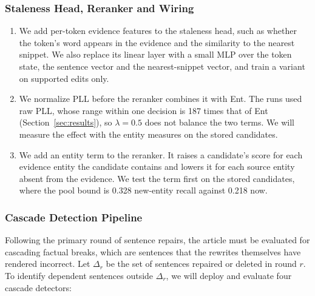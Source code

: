 \documentclass[11pt]{article}
\begin{document}
    \subsubsection{Staleness Head, Reranker and Wiring}
    \begin{enumerate}
        \item We add per-token evidence features to the staleness head, such as whether the token's word appears in the evidence and the similarity to the nearest snippet. We also replace its linear layer with a small MLP over the token state, the sentence vector and the nearest-snippet vector, and train a variant on supported edits only.
        \item We normalize PLL before the reranker combines it with Ent. The runs used raw PLL, whose range within one decision is 187 times that of Ent (Section~\ref{sec:results}), so $\lambda = 0.5$ does not balance the two terms. We will measure the effect with the entity measures on the stored candidates.
        \item We add an entity term to the reranker. It raises a candidate's score for each evidence entity the candidate contains and lowers it for each source entity absent from the evidence. We test the term first on the stored candidates, where the pool bound is 0.328 new-entity recall against 0.218 now.
    \end{enumerate}

    \subsubsection{Cascade Detection Pipeline}
    
        Following the primary round of sentence repairs, the article must be evaluated for cascading factual breaks, which are sentences that the rewrites themselves have rendered incorrect. Let $\Delta_r$ be the set of sentences repaired or deleted in round $r$. To identify dependent sentences outside $\Delta_r$, we will deploy and evaluate four cascade detectors:
\end{document}
